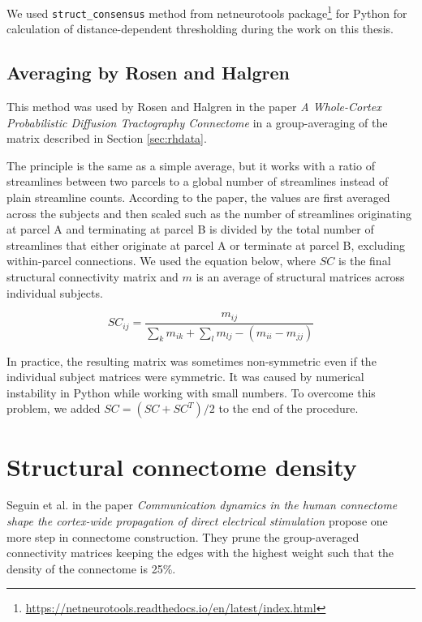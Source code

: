 We used \texttt{struct\_consensus} method from netneurotools package\footnote{\url{https://netneurotools.readthedocs.io/en/latest/index.html}} for Python for calculation of distance-dependent thresholding during the work on this thesis.

\subsection{Averaging by Rosen and Halgren}\label{sec:rh}

This method was used by Rosen and Halgren in the paper \textit{A Whole-Cortex Probabilistic Diffusion Tractography Connectome} \cite{rosen_whole-cortex_2021} in a group-averaging of the matrix described in Section \ref{sec:rhdata}.

The principle is the same as a simple average, but it works with a ratio of streamlines between two parcels to a global number of streamlines instead of plain streamline counts. According to the paper, the values are first averaged across the subjects and then scaled such as the number of streamlines originating at parcel A and terminating at parcel B is divided by the total number of streamlines that either originate at parcel A or terminate at parcel B, excluding within-parcel connections. \cite{rosen_whole-cortex_2021} We used the equation below, where $SC$ is the final structural connectivity matrix and $m$ is an average of structural matrices across individual subjects.

$$
SC_{ij} = \frac{m_{ij}}{\sum_k m_{ik} + \sum_l m_{lj} - (m_{ii} - m_{jj})}
$$

In practice, the resulting matrix was sometimes non-symmetric even if the individual subject matrices were symmetric. It was caused by numerical instability in Python while working with small numbers. To overcome this problem, we added $SC = (SC + SC^T) /2$ to the end of the procedure.

\section{Structural connectome density}\label{sec:density}

Seguin et al. \cite{seguin_communication_2023} in the paper \textit{Communication dynamics in the human connectome shape the cortex-wide propagation of direct electrical stimulation} propose one more step in connectome construction. They prune the group-averaged connectivity matrices keeping the edges with the highest weight such that the density of the connectome is 25\%. 

